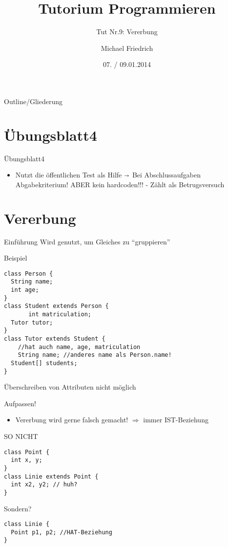 \documentclass[18pt]{beamer}
\title[Prog Tut Nr. 9]{Tutorium Programmieren}
\subtitle{Tut Nr.9: Vererbung}
\author{Michael Friedrich}
\date{07. / 09.01.2014}
\institute{Institut f\"ur theoretische Informatik}
\begin{document}

\begin{frame}
	\titlepage
\end{frame}

\begin{frame}{Outline/Gliederung}

	\tableofcontents
\end{frame}

\section{Übungsblatt4}
\begin{frame}{Übungsblatt4}
\begin{itemize}
	\item Nutzt die öffentlichen Test als Hilfe \newline \pause
	$\shortrightarrow$ Bei Abschlussaufgaben Abgabekriterium! \newline
	ABER kein hardcoden!!! - Zählt als Betrugsversuch
\end{itemize}
\end{frame}

\section{Vererbung}
\begin{frame}[fragile]{Einführung}
Wird genutzt, um Gleiches zu "`gruppieren"'
\begin{exampleblock}{Beispiel}
\begin{lstlisting}
class Person {
  String name;
  int age;
}
class Student extends Person {
	   int matriculation;
  Tutor tutor;
}
class Tutor extends Student {
	//hat auch name, age, matriculation
	String name; //anderes name als Person.name!
  Student[] students;
}
\end{lstlisting}
\end{exampleblock}
\color[rgb]{1,0,0}{ACHTUNG} Überschreiben von Attributen nicht möglich
\end{frame}

\begin{frame}[fragile]{Aufpassen!}
\begin{itemize}
\item Vererbung wird gerne falsch gemacht! $\Rightarrow$ immer IST-Beziehung
\end{itemize}
\begin{exampleblock}{SO NICHT}
\begin{lstlisting}
class Point {
  int x, y;
}
class Linie extends Point {
  int x2, y2; // huh?
}
\end{lstlisting}
\end{exampleblock} \pause
\begin{exampleblock}{Sondern?} \pause
\begin{lstlisting}
class Linie {
  Point p1, p2; //HAT-Beziehung
}
\end{lstlisting}
\end{exampleblock}
\end{frame}
\end{document}
